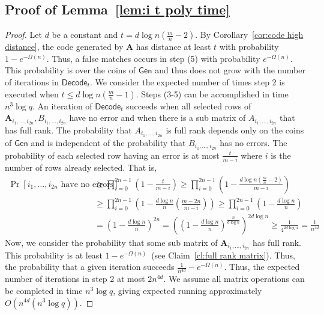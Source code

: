 \documentclass[11pt]{article}
\newcommand{\corref}[1]{\mbox{Corollary~\ref{#1}}}
\newcommand{\lemref}[1]{\mbox{Lemma~\ref{#1}}}
\newcommand{\clref}[1]{\mbox{Claim~\ref{#1}}}
\newcommand{\class}[1]{{\ensuremath{\mathsf{#1}}}}
\newcommand{\gen}{\ensuremath{\class{Gen}}\xspace}
\newcommand{\vect}[1]{\ensuremath{\textbf{#1}}}
\newcommand{\decode}{\ensuremath{\mathsf{Decode}}}
\newcommand{\vA}{\vect{A}}
\begin{document}
\subsection{Proof of \lemref{lem:i t poly time}}
\label{sec:proof lem i t poly time}
\begin{proof}
Let $d$ be a constant and $t = d\log n\left( \frac{m}{n}-2\right)$.  
By \corref{cor:code high distance}, the code generated by $\vA$ has distance at least $t$ with probability $1-e^{-\Omega(n)}$.  Thus, a false matches occurs in step (5) with probability $e^{-\Omega(n)}$.  This probability is over the coins of $\gen$ and thus does not grow with the number of iterations in $\decode_t$.  We consider the expected number of times step 2 is executed when $t\leq d\log n\left(\frac{m}{n}-1\right)$.  Steps (3-5) can be accomplished in time $n^3\log q $.  An iteration of $\decode_t$ succeeds when all selected rows of $\vA_{i_1,..., i_{2n}}, B_{i_1,..., i_{2n}}$ have no error and when there is a sub matrix of $A_{i_1,..., i_{2n}}$ that has full rank.  The probability that $A_{i_1,..., i_{2n}}$ is full rank depends only on the coins of $\gen$ and is independent of the probability that $B_{i_1,...,i_{2n}}$ has no errors.  The probability of each selected row having an error is at most $\frac{t}{m - i}$ where $i$ is the number of rows already selected.  That is,
\begin{align*}
\Pr[i_1,..., i_{2n}\text{ have no errors}]&\geq \prod_{i=0}^{2n-1}\left(1 - \frac{t}{m-i}\right)\geq \prod_{i=0}^{2n-1}\left( 1-\frac{d\log n\left(\frac{m}{n}-2\right)}{m-i}\right)\\
&\geq  \prod_{i=0}^{2n-1}\left( 1-\frac{d\log n}{n}\left(\frac{m-2n}{m-i}\right)\right)\geq \prod_{i=0}^{2n-1}\left( 1-\frac{d\log n}{n}\right) \\
&= \left(1-\frac{d\log n}{n}\right)^{2n}  = \left(\left(1-\frac{d\log n}{n}\right)^{\frac{n}{d\log n}}\right)^{2d\log n}\geq \frac{1}{4^{2d\log n}} = \frac{1}{n^{4d}}
\end{align*}
Now, we consider the probability that some sub matrix of $\vA_{i_1,..., i_{2n}}$ has full rank.  This probability is at least $1-e^{-\Omega(n)}$~(see \clref{cl:full rank matrix}).  Thus, the probability that a given iteration succeeds $\frac{1}{n^{4d}} - e^{-\Omega(n)}$.  
Thus, the expected number of iterations in step 2 at most  $2n^{4d}$.  We assume all matrix operations can be completed in time $n^3\log q$, giving expected running approximately $O(n^{4d}(n^3 \log q))$.  
\end{proof}
\end{document}
